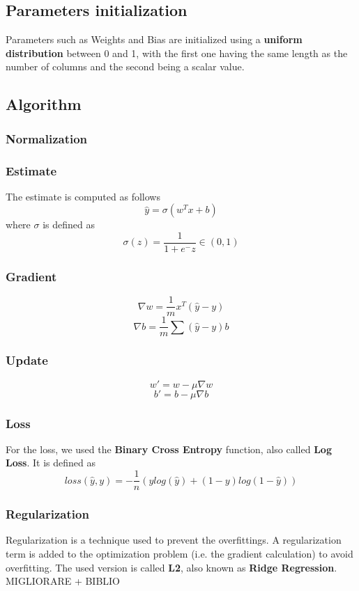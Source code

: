 \documentclass[
	letterpaper, %
	10pt, %
]{class}
\begin{document}
\subsection{Parameters initialization}
Parameters such as Weights and Bias are initialized using a \textbf{uniform distribution} between 0 and 1, with the first one having the same length as the number of columns and the second being a scalar value.

\subsection{Algorithm}

\subsubsection{Normalization}

\subsubsection{Estimate}
The estimate is computed as follows
$$ \hat{y} = \sigma(w^Tx + b) $$
where $\sigma$ is defined as
$$ \sigma(z) = \frac{1}{1 + e^-z} \in (0,1) $$

\subsubsection{Gradient}

$$ \nabla w = \frac{1}{m}x^T(\hat{y} - y) $$
$$\nabla b = \frac{1}{m}\sum(\hat{y} - y) b $$

\subsubsection{Update}


$$ w' = w - \mu \nabla w $$
$$ b' = b - \mu \nabla b $$

\subsubsection{Loss}
For the loss, we used the \textbf{Binary Cross Entropy} function, also called \textbf{Log Loss}.
It is defined as
$$ loss(\hat{y}, y) = -\frac{1}{n}(y log(\hat{y}) + (1-y)log(1-\hat{y}))$$


\subsubsection{Regularization}
Regularization is a technique used to prevent the overfittings. A regularization term is added to the optimization problem (i.e. the gradient calculation) to avoid overfitting.
The used version is called \textbf{L2}, also known as \textbf{Ridge Regression}. MIGLIORARE + BIBLIO\\
\end{document}
